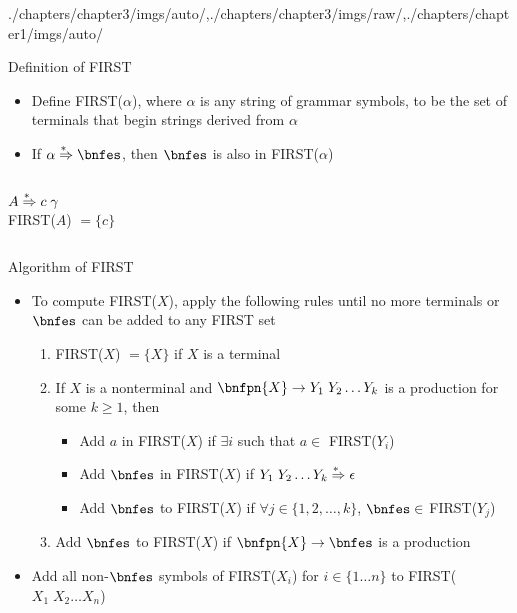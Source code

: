 \begin{graphicspathcontext}{{./chapters/chapter3/imgs/auto/},{./chapters/chapter3/imgs/raw/},{./chapters/chapter1/imgs/auto/}}
\begin{bibunit}[apalike]
\begin{frame}{Definition of FIRST}
	\begin{itemize}
	\item Define FIRST($\alpha$), where $\alpha$ is any string of grammar symbols, to be the set of terminals that begin strings derived from $\alpha$
	\item If $\alpha \seqderiv \bnfes$, then $\bnfes$ is also in FIRST($\alpha$)
	\end{itemize}
	\vfill
	\begin{example}
		\begin{columns}
			\begin{column}[t]{.4\linewidth}
				$A \overset{*\hspace{.4em}}{\Rightarrow} c \; \gamma$ \\
				FIRST($A$) $ = \{ c \}$
			\end{column}
			\begin{column}[t]{.4\linewidth}
			\end{column}
		\end{columns}
	\end{example}
\end{frame}

\begin{frame}[background=8]{Algorithm of FIRST}
	\begin{itemize}
	\item To compute FIRST($X$), apply the following rules until no more terminals or $\bnfes$ can be added to any FIRST set
	\vfill
		\begin{enumerate}
		\item FIRST($X$) $= \{ X \}$ if $X$ is a terminal
		\item If $X$ is a nonterminal and $\bnfpn{X} \bnfopo Y_1 \; Y_2 \dots Y_k$ is a production for some $k \ge 1$, then 
			\begin{itemize}
				\item Add $a$ in FIRST($X$) if $\exists i$ such that $a \in$ FIRST($Y_i$) 
				\item Add $\bnfes$ in FIRST($X$) if $Y_1\;Y_2 \dots Y_k \overset{*\hspace{.4em}}{\Rightarrow} \epsilon$
				\item Add $\bnfes$ to FIRST($X$) if $\forall j \in \{1, 2, \dots, k\}$, $\bnfes \in$ FIRST($Y_j$)
			\end{itemize}
		\item Add $\bnfes$ to FIRST($X$) if $\bnfpn{X} \bnfopo \bnfes$ is a production
		\end{enumerate}
	\vfill
	\item Add all non-$\bnfes$ symbols of FIRST($X_i$) for $i \in \{1 \dots n\}$ to FIRST($X_1\;X_2 \dots X_n$) 
	\end{itemize}
\end{frame}


\end{bibunit}
\end{graphicspathcontext}
